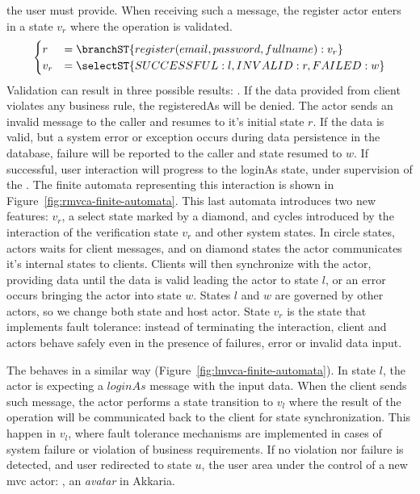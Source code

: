 the user must provide. When receiving such a message, the register
actor enters in a state $v_r$ where the operation is validated.
\begin{align}
  \begin{cases}
    r &= \branchST{register(email, password, fullname): v_r}\\
    v_r &= \selectST{SUCCESSFUL: l, INVALID: r, FAILED: w}
  \end{cases}
          \label{eq:rmvca-register-validate}
\end{align}
%
Validation can result in three possible results: .
%
If the data provided from client violates any business rule, the
registeredAs will be denied. The actor sends an invalid message to the
caller and resumes to it's initial state $r$.
%
If the data is valid, but a system error or exception occurs during
data persistence in the database, failure will be reported to the
caller and state resumed to $w$.
%
If successful, user interaction will progress to the loginAs state,
under supervision of the .
%
The finite automata representing this interaction is shown in
Figure~\ref{fig:rmvca-finite-automata}.
%
 This last automata
introduces two new features: $v_r$, a select state marked by a
diamond, and cycles introduced by the interaction of the verification
state $v_r$ and other system states.
%
In circle states, actors waits for client messages, and on diamond
states the actor communicates it's internal states to clients. Clients
will then synchronize with the actor, providing data until the data is
valid leading the actor to state $l$, or an error occurs bringing the
actor into state $w$. States $l$ and $w$ are governed by other actors,
so we change both state and host actor.
%
State $v_r$ is the state that implements fault tolerance: instead of
terminating the interaction, client and actors behave safely even in
the presence of failures, error or invalid data input.
%
\par
%
The  behaves in a similar way
(Figure~\ref{fig:lmvca-finite-automata}). In state $l$, the actor is
expecting a $loginAs$ message with the input data. When the client sends
such message, the actor performs a state transition to $v_l$ where the
result of the operation will be communicated back to the client for
state synchronization. This happen in $v_l$, where fault tolerance
mechanisms are implemented in cases of system failure or violation of
business requirements. If no violation nor failure is detected, and
user redirected to state $u$, the user area under the control of a new
mvc actor: , an \emph{avatar} in Akkaria.
%

%



